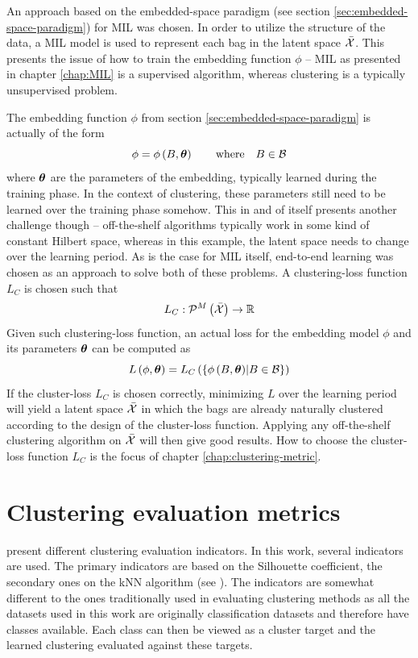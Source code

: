 An approach based on the embedded-space paradigm (see section \ref{sec:embedded-space-paradigm}) for MIL was chosen. In order to utilize the structure of the data, a MIL model is used to represent each bag in the latent space \( \bar{\mathcal{X}} \). This presents the issue of how to train the embedding function \( \phi \) -- MIL as presented in chapter \ref{chap:MIL} is a supervised algorithm, whereas clustering is a typically unsupervised problem.

The embedding function \( \phi \) from section \ref{sec:embedded-space-paradigm} is actually of the form
\[ \phi = \phi \left( B, \bm{\theta} \right) \qquad \text{where} \quad B \in \mathcal{B} \]
where \( \bm{\theta} \) are the parameters of the embedding, typically learned during the training phase. In the context of clustering, these parameters still need to be learned over the training phase somehow. This in and of itself presents another challenge though -- off-the-shelf algorithms typically work in some kind of constant Hilbert space, whereas in this example, the latent space needs to change over the learning period. As is the case for MIL itself, end-to-end learning was chosen as an approach to solve both of these problems. A clustering-loss function \( L_C \) is chosen such that
\[ L_C: \mathcal{P}^M \left( \bar{\mathcal{X}} \right) \to \mathbb{R} \]
Given such clustering-loss function, an actual loss for the embedding model \( \phi \) and its parameters \( \bm{\theta} \) can be computed as
\[ L \left( \phi, \bm{\theta} \right) = L_C \left( \left\{ \phi \left( B, \bm{\theta} \right) \middle| B \in \mathcal{B} \right\} \right) \]
If the cluster-loss \( L_C \) is chosen correctly, minimizing \( L \) over the learning period will yield a latent space \( \bar{\mathcal{X}} \) in which the bags are already naturally clustered according to the design of the cluster-loss function. Applying any off-the-shelf clustering algorithm on \( \bar{\mathcal{X}} \) will then give good results. How to choose the cluster-loss function \( L_C \) is the focus of chapter \ref{chap:clustering-metric}.

\section{Clustering evaluation metrics}

\cite{xu_comprehensive_2015} present different clustering evaluation indicators. In this work, several indicators are used. The primary indicators are based on the Silhouette coefficient, the secondary ones on the kNN algorithm (see \cite{dasarathy_nearest_1991}). The indicators are somewhat different to the ones traditionally used in evaluating clustering methods as all the datasets used in this work are originally classification datasets and therefore have classes available. Each class can then be viewed as a cluster target and the learned clustering evaluated against these targets.

